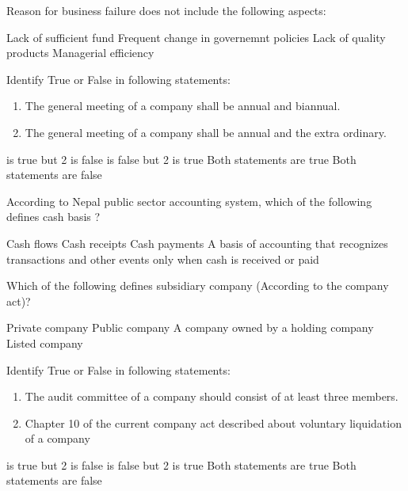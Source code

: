 \begin{questions}
\question Reason for business failure does not include the following aspects:
  \begin{choices}
  \choice Lack of sufficient fund
  \choice Frequent change in governemnt policies
  \choice Lack of quality products
  \choice Managerial efficiency
  \end{choices}

\question Identify True or False in following statements:
  \begin{enumerate}
  \item The general meeting of a company shall be annual and biannual.
  \item The general meeting of a company shall be annual and the extra ordinary.
  \end{enumerate}
  \begin{choices}
   is true but 2 is false
   is false but 2 is true
  \choice Both statements are true
  \choice Both statements are false
  \end{choices}

\question According to Nepal public sector accounting system, which of the following defines cash basis ?
  \begin{choices}
  \choice Cash flows
  \choice Cash receipts
  \choice Cash payments
  \choice A basis of accounting that recognizes transactions and other events only when cash is received or paid
  \end{choices}

\question Which of the following defines subsidiary company (According to the company act)?
  \begin{choices}
  \choice Private company
  \choice Public company
  \choice A company owned by a holding company
  \choice Listed company
  \end{choices}

\question Identify True or False in following statements:
  \begin{enumerate}
  \item The audit committee of a company should consist of at least three members.
  \item Chapter 10 of the current company act described about voluntary liquidation of a company
  \end{enumerate}
  \begin{choices}
   is true but 2 is false
   is false but 2 is true
  \choice Both statements are true
  \choice Both statements are false
  \end{choices}


\end{questions}
